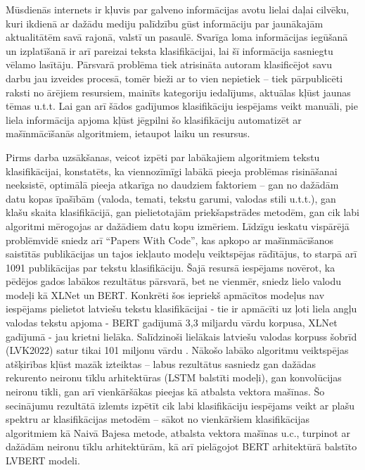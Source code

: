 Mūsdienās internets ir kļuvis par galveno informācijas avotu lielai daļai cilvēku, kuri ikdienā ar dažādu mediju palīdzību gūst informāciju par jaunākajām aktualitātēm savā rajonā, valstī un pasaulē. Svarīga loma informācijas iegūšanā un izplatīšanā ir arī pareizai teksta klasifikācijai, lai šī informācija sasniegtu vēlamo lasītāju. Pārsvarā problēma tiek atrisināta autoram klasificējot savu darbu jau izveides procesā, tomēr bieži ar to vien nepietiek – tiek pārpublicēti raksti no ārējiem resursiem, mainīts kategoriju iedalījums, aktuālas kļūst jaunas tēmas u.t.t. Lai gan arī šādos gadījumos klasifikāciju iespējams veikt manuāli, pie liela informācija apjoma kļūst jēgpilni šo klasifikāciju automatizēt ar mašīnmācīšanās algoritmiem, ietaupot laiku un resursus. 

Pirms darba uzsākšanas, veicot izpēti par labākajiem algoritmiem tekstu klasifikācijai, konstatēts, ka viennozīmīgi labākā pieeja problēmas risināšanai neeksistē, optimālā pieeja atkarīga no daudziem faktoriem – gan no dažādām datu kopas īpašībām (valoda, temati, tekstu garumi, valodas stili u.t.t.), gan klašu skaita klasifikācijā, gan pielietotajām priekšapstrādes metodēm, gan cik labi algoritmi mērogojas ar dažādiem datu kopu izmēriem. Līdzīgu ieskatu vispārējā problēmvidē sniedz arī “Papers With Code”\cite{PapersWithCode}, kas apkopo ar mašīnmācīšanos saistītās publikācijas un tajos iekļauto modeļu veiktspējas rādītājus, to starpā arī 1091 publikācijas par tekstu klasifikāciju. Šajā resursā iespējams novērot, ka pēdējos gados labākos rezultātus pārsvarā, bet ne vienmēr, sniedz lielo valodu modeļi kā XLNet un BERT. Konkrēti šos iepriekš apmācītos modeļus nav iespējams pielietot latviešu tekstu klasifikācijai - tie ir apmācīti uz ļoti liela angļu valodas tekstu apjoma - BERT gadījumā 3,3 miljardu vārdu korpusa, XLNet gadījumā - jau krietni lielāka. Salīdzinoši lielākais latviešu valodas korpuss šobrīd (LVK2022) satur tikai 101 miljonu vārdu \cite{LVK2022}. Nākošo labāko algoritmu veiktspējas atšķirības kļūst mazāk izteiktas – labus rezultātus sasniedz gan dažādas rekurento neironu tīklu arhitektūras (LSTM balstīti modeļi), gan konvolūcijas neironu tīkli, gan arī vienkāršākas pieejas kā atbalsta vektora mašīnas. Šo secinājumu rezultātā izlemts izpētīt cik labi klasifikāciju iespējams veikt ar plašu spektru ar klasifikācijas metodēm – sākot no vienkāršiem klasifikācijas algoritmiem kā Naivā Bajesa metode, atbalsta vektora mašīnas u.c., turpinot ar dažādām neironu tīklu arhitektūrām, kā arī pielāgojot BERT arhitektūrā balstīto LVBERT modeli. 

